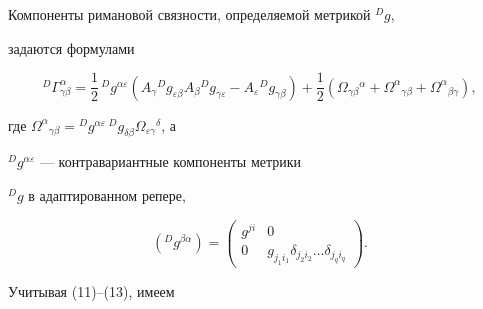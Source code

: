 Компоненты римановой связности, определяемой метрикой ${}^Dg$,


задаются формулами


\begin{equation}


{}^D\Gamma^\alpha_{\gamma\beta}=\frac{1}{2}\,{}^Dg^{\alpha\varepsilon}


(A_\gamma{}^Dg_{\varepsilon\beta}A_\beta


{}^Dg_{\gamma\varepsilon}-A_\varepsilon{}^Dg_{\gamma\beta})+


\frac{1}{2}(\Omega_{\gamma\beta}{}^\alpha+


\Omega^\alpha{}_{\gamma\beta}+\Omega^\alpha{}_{\beta\gamma}),


\end{equation}


где $\Omega^\alpha{}_{\gamma\beta}={}^D g^{\alpha\varepsilon}\,{}^D


g_{\delta\beta}\Omega_{\varepsilon\gamma}{}^\delta$, а


${}^Dg^{\alpha\varepsilon}$ --- контравариантные компоненты метрики


${}^Dg$ в адаптированном репере,


\begin{equation}


({}^Dg^{\beta\alpha})=\begin{pmatrix}


g^{ji} & 0 \\ 0 & g_{j_1i_1}\delta_{j_2i_2}\dotsc


\delta_{j_q i_q}


\end{pmatrix}


.


\end{equation}


Учитывая  (11)--(13), имеем


